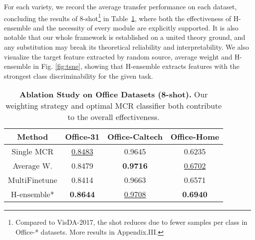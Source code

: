 \documentclass[letterpaper]{article} %
\begin{document}
For each variety, we record the average transfer performance on each dataset, concluding the results of 8-shot\footnote{Compared to VisDA-2017, the shot reduces due to fewer samples per class in Office-* datasets. More results in Appendix.III.} in Table~\ref{tab:ablation}, where both the effectiveness of H-ensemble and the necessity of every module are explicitly supported. It is also notable that our whole framework is established on a united theory ground, and any substitution may break its theoretical reliability and interpretability. We also visualize the target feature extracted by random source, average weight and H-ensemble in Fig. \ref{fig:tsne}, showing that H-ensemble extracts features with the strongest class discriminability for the given task. %



 \begin{table}[!ht]
    \renewcommand{\arraystretch}{1.2}
    \centering
    \begin{tabular}{c |c c c }
          \toprule
          Method & Office-31 & Office-Caltech & Office-Home  \\
          \midrule
          Single MCR & \underline{0.8483}  &  0.9645  &  0.6235 \\
          Average W. &  0.8479  &  \textbf{0.9716}  &  \underline{0.6702} \\
          MultiFinetune  &  0.8414  &  0.9663  &  0.6571 \\
          H-ensemble* & \textbf{0.8644} & \underline{0.9708} & \textbf{0.6940}\\
          \bottomrule
    \end{tabular}
    \caption{\textbf{Ablation Study on Office Datasets (8-shot).} Our weighting strategy and optimal MCR classifier both contribute to the overall effectiveness.
    }
    \label{tab:ablation}
\end{table}
\end{document}
